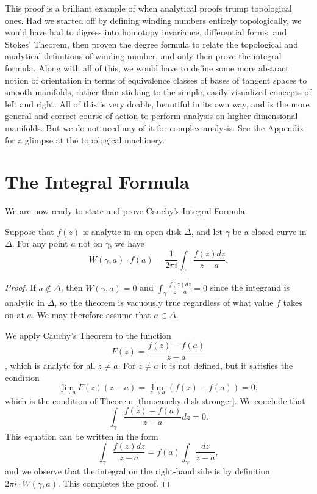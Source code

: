 This proof is a brilliant example of when analytical proofs trump topological ones. Had we started off by defining winding numbers entirely topologically, we would have had to digress into homotopy invariance, differential forms, and Stokes' Theorem, then proven the degree formula to relate the topological and analytical definitions of winding number, and only then prove the integral formula. Along with all of this, we would have to define some more abstract notion of orientation in terms of equivalence classes of bases of tangent spaces to smooth manifolds, rather than sticking to the simple, easily visualized concepts of left and right. All of this is very doable, beautiful in its own way, and is the more general and correct course of action to perform analysis on higher-dimensional manifolds. But we do not need any of it for complex analysis. See the Appendix for a glimpse at the topological machinery.

\section{The Integral Formula}
We are now ready to state and prove Cauchy's Integral Formula.

\begin{theorem}
\label{thm:cauchy-integral-formula}
Suppose that $f(z)$ is analytic in an open disk $\Delta$, and let $\gamma$ be a closed curve in $\Delta$. For any point $a$ not on $\gamma$, we have $$W(\gamma, a) \cdot f(a)=\dfrac{1}{2\pi i}\int_{\gamma} \dfrac{f(z)dz}{z-a}.$$
\end{theorem}
\begin{proof}
If $a \notin \Delta$, then $W(\gamma, a)=0$ and $\int_{\gamma} \frac{f(z)dz}{z-a}=0$ since the integrand is analytic in $\Delta$, so the theorem is vacuously true regardless of what value $f$ takes on at $a$. We may therefore assume that $a \in \Delta$.

We apply Cauchy's Theorem to the function $$F(z)=\dfrac{f(z)-f(a)}{z-a}$$, which is analytc for all $z \neq a$. For $z \neq a$ it is not defined, but it satisfies the condition $$\lim_{z \rightarrow a}F(z)(z-a)=\lim_{z \rightarrow a}(f(z)-f(a))=0,$$ which is the condition of Theorem \ref{thm:cauchy-disk-stronger}. We conclude that $$\int_{\gamma} \dfrac{f(z)-f(a)}{z-a}dz=0.$$ This equation can be written in the form $$\int_{\gamma} \dfrac{f(z)dz}{z-a}=f(a)\int_{\gamma} \dfrac{dz}{z-a},$$ and we observe that the integral on the right-hand side is by definition $2\pi i \cdot W(\gamma, a)$. This completes the proof.
\end{proof}

